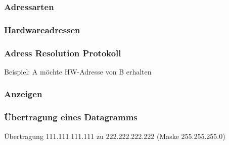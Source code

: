 \subsubsection{Adressarten}
\subsubsection{Hardwareadressen}
\subsubsection{Adress Resolution Protokoll}
Beispiel: A möchte HW-Adresse von B erhalten
\subsubsection*{Anzeigen}
\subsubsection{Übertragung eines Datagramms}
Übertragung 111.111.111.111 zu 222.222.222.222 (Maske 255.255.255.0)










